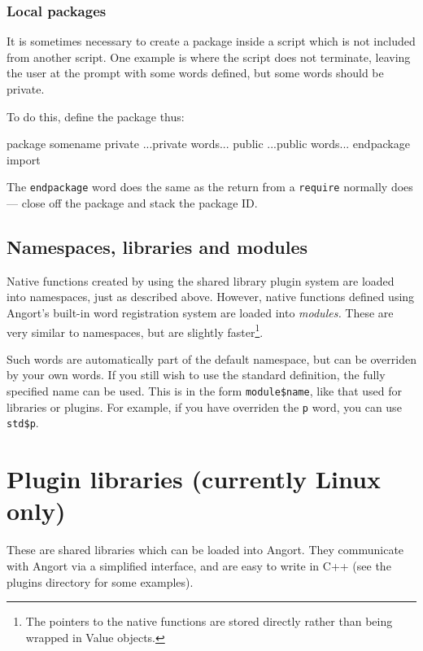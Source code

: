 \subsubsection{Local packages}
It is sometimes necessary to create a package inside a script which
is not included from another script. One example is where the script
does not terminate, leaving the user at the prompt with some words defined,
but some words should be private.

To do this, define the package thus:
\begin{v}
package somename
private
...private words...
public
...public words...
endpackage import
\end{v}
The \texttt{endpackage} word does the same as the return from a 
\texttt{require} normally does --- close off the package and
stack the package ID.

\subsection{Namespaces, libraries and modules}
\label{nameslibsmods}
Native functions created by using the shared library plugin system
are loaded into namespaces, just as described above. However, native
functions defined using Angort's built-in word registration system
are loaded into \emph{modules.} These are very similar to namespaces,
but are slightly faster\footnote{The pointers to the native functions
are stored directly rather than being wrapped in Value objects.}. 

Such words are automatically part of the default namespace, but can
be overriden by your own words. If you still wish to use the standard
definition, the fully specified name can be used. This is in the form
\verb+module$name+, like that used for libraries or plugins. For example,
if you have overriden the \texttt{p} word, you can use \verb+std$p+.

\section{Plugin libraries (currently Linux only)}
These are shared libraries which can be loaded into Angort. They communicate
with Angort via a simplified interface, and are easy to write in C++ (see
the plugins directory for some examples). 

